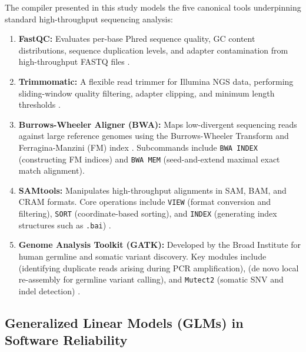 \documentclass[12pt,a4paper]{article}
\begin{document}
The compiler presented in this study models the five canonical tools underpinning standard high-throughput sequencing analysis:
\begin{enumerate}
    \item \textbf{FastQC:} Evaluates per-base Phred sequence quality, GC content distributions, sequence duplication levels, and adapter contamination from high-throughput FASTQ files \cite{andrews2010}.
    \item \textbf{Trimmomatic:} A flexible read trimmer for Illumina NGS data, performing sliding-window quality filtering, adapter clipping, and minimum length thresholds \cite{bolger2014}.
    \item \textbf{Burrows-Wheeler Aligner (BWA):} Maps low-divergent sequencing reads against large reference genomes using the Burrows-Wheeler Transform and Ferragina-Manzini (FM) index \cite{li2009b}. Subcommands include \texttt{BWA INDEX} (constructing FM indices) and \texttt{BWA MEM} (seed-and-extend maximal exact match alignment).
    \item \textbf{SAMtools:} Manipulates high-throughput alignments in SAM, BAM, and CRAM formats. Core operations include \texttt{VIEW} (format conversion and filtering), \texttt{SORT} (coordinate-based sorting), and \texttt{INDEX} (generating index structures such as \texttt{.bai}) \cite{li2009}.
    \item \textbf{Genome Analysis Toolkit (GATK):} Developed by the Broad Institute for human germline and somatic variant discovery. Key modules include  (identifying duplicate reads arising during PCR amplification),  (de novo local re-assembly for germline variant calling), and \texttt{Mutect2} (somatic SNV and indel detection) \cite{mckenna2010,vanderauwera2020}.
\end{enumerate}

\subsection{Generalized Linear Models (GLMs) in Software Reliability}
\end{document}
